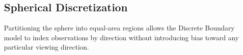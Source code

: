 \subsection{Spherical Discretization}
\label{sec:spherical_discretization_background}

Partitioning the sphere into equal-area regions allows the Discrete Boundary model to index observations by direction without introducing bias toward any particular viewing direction.
